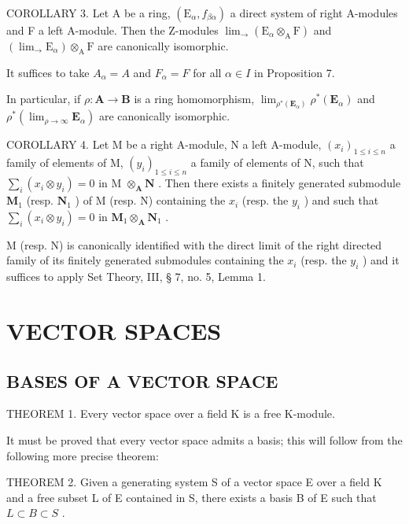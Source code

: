COROLLARY 3. Let A be a ring, \((\mathrm{E}_{\alpha}, f_{\beta\alpha})\) a direct system of right A-modules and F a left A-module. Then the Z-modules \(\lim_{\longrightarrow} (\mathrm{E}_{\alpha} \otimes_{\mathrm{A}} \mathrm{F})\) and \((\lim_{\longrightarrow} \mathrm{E}_{\alpha}) \otimes_{\mathrm{A}} \mathrm{F}\) are canonically isomorphic.

It suffices to take \(A_{\alpha} = A\) and \(F_{\alpha} = F\) for all \(\alpha \in I\) in Proposition 7.

In particular, if \(\rho: \mathbf{A} \to \mathbf{B}\) is a ring homomorphism, \(\lim_{\rho^* (\mathbf{E}_\alpha)} \rho^*(\mathbf{E}_\alpha)\) and \(\rho^*(\lim_{\rho \to \infty} \mathbf{E}_\alpha)\) are canonically isomorphic.

COROLLARY 4. Let M be a right A-module, N a left A-module, \((x_{i})_{1\leqslant i\leqslant n}\) a family of elements of M, \((y_{i})_{1\leqslant i\leqslant n}\) a family of elements of N, such that \(\sum_{i}(x_{i}\otimes y_{i}) = 0\) in M \(\otimes_{\mathbf{A}}\mathbf{N}\) . Then there exists a finitely generated submodule \(\mathbf{M}_1\) (resp. \(\mathbf{N}_1\) ) of M (resp. N) containing the \(x_{i}\) (resp. the \(y_{i}\) ) and such that \(\sum_{i}(x_{i}\otimes y_{i}) = 0\) in \(\mathbf{M}_1\otimes_{\mathbf{A}}\mathbf{N}_1\) .

M (resp. N) is canonically identified with the direct limit of the right directed family of its finitely generated submodules containing the \(x_{i}\) (resp. the \(y_{i}\) ) and it suffices to apply Set Theory, III, § 7, no. 5, Lemma 1.

\section{VECTOR SPACES}

\subsection{BASES OF A VECTOR SPACE}

THEOREM 1. Every vector space over a field K is a free K-module.

It must be proved that every vector space admits a basis; this will follow from the following more precise theorem:

THEOREM 2. Given a generating system S of a vector space E over a field K and a free subset L of E contained in S, there exists a basis B of E such that \(L \subset B \subset S\) .

